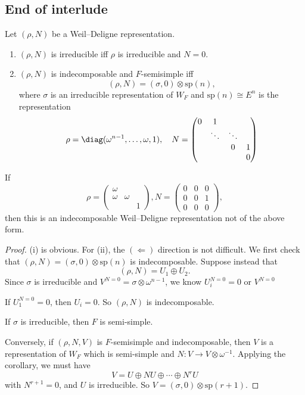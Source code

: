 \documentclass[a4paper]{article}
\renewcommand\sp{\mathrm{sp}}
\begin{document}
\subsection{End of interlude}
\begin{prop}
  Let $(\rho, N)$ be a Weil--Deligne representation.
  \begin{enumerate}
    \item $(\rho, N)$ is irreducible iff $\rho$ is irreducible and $N = 0$.
    \item $(\rho, N)$ is indecomposable and $F$-semisimple iff
      \[
        (\rho, N) = (\sigma, 0) \otimes \sp(n),
      \]
      where $\sigma$ is an irreducible representation of $W_F$ and $\sp(n) \cong E^n$ is the representation
      \[
        \rho = \diag(\omega^{n - 1}, \ldots, \omega, 1),\quad N =
        \begin{pmatrix}
          0 & 1\\
          & \ddots & \ddots\\
          & & 0 & 1\\
          & & & 0
        \end{pmatrix}
      \]
  \end{enumerate}
\end{prop}

\begin{eg}
  If
  \[
    \rho =
    \begin{pmatrix}
      \omega \\
      \omega & \omega\\
      & & 1
    \end{pmatrix}, N=
    \begin{pmatrix}
      0 & 0 & 0\\
      0 & 0 & 1\\
      0 & 0 & 0
    \end{pmatrix},
  \]
  then this is an indecomposable Weil--Deligne representation not of the above form.
\end{eg}

\begin{proof}
  (i) is obvious. For (ii), the $(\Leftarrow)$ direction is not difficult. We first check that $(\rho, N) = (\sigma, 0) \otimes \sp(n)$ is indecomposable. Suppose instead that
  \[
    (\rho, N) = U_1 \oplus U_2.
  \]
  Since $\sigma$ is irreducible and $V^{N = 0} = \sigma \otimes \omega^{n - 1}$, we know $U_i^{N = 0} = 0 $ or $V^{N = 0}$ %

  If $U_1^{N = 0} = 0$, then $U_i = 0$. So $(\rho, N)$ is indecomposable.

  If $\sigma$ is irreducible, then $F$ is semi-simple.

  Conversely, if $(\rho, N, V)$ is $F$-semisimple and indecomposable, then $V$ is a representation of $W_F$ which is semi-simple and $N: V \to V \otimes \omega^{-1}$. Applying the corollary, we must have
  \[
    V = U \oplus NU \oplus \cdots \oplus N^r U
  \]
  with $N^{r + 1} = 0$, and $U$ is irreducible. So $V = (\sigma, 0) \otimes \sp(r + 1)$.
\end{proof}
\end{document}

